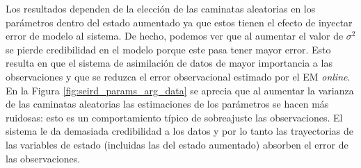 Los resultados dependen de la elección de las caminatas aleatorias en los parámetros dentro del estado aumentado ya que estos tienen el efecto de inyectar error de modelo al sistema. De hecho, podemos ver que al aumentar el valor de $\sigma^2$ se pierde credibilidad en el modelo porque este pasa tener mayor error. Esto resulta en que el sistema de asimilación de datos de mayor importancia a las observaciones y que se reduzca el error observacional estimado por el EM \textit{online}. En la Figura \ref{fig:seird_params_arg_data} se aprecia que al aumentar la varianza de las caminatas aleatorias las estimaciones de los parámetros se hacen más ruidosas: esto es un comportamiento típico de sobreajuste las observaciones. El sistema le da demasiada credibilidad a los datos y por lo tanto las trayectorias de las variables de estado (incluidas las del estado aumentado) absorben el error de las observaciones.

